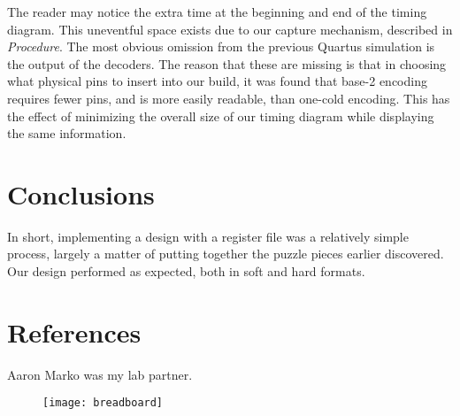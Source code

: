 \documentclass[titlepage]{article}
\begin{document}
        The reader may notice the extra time at the beginning and end of the timing diagram.
        This uneventful space exists due to our capture mechanism, described in \textit{Procedure}.
        The most obvious omission from the previous Quartus simulation is the output of the decoders.
        The reason that these are missing is that in choosing what physical pins to insert into our build, it was found that base-2 encoding requires fewer pins, and is more easily readable, than one-cold encoding.
        This has the effect of minimizing the overall size of our timing diagram while displaying the same information.
        
        
    \section{Conclusions}
        
        In short, implementing a design with a register file was a relatively simple process, largely a matter of putting together the puzzle pieces earlier discovered.
        Our design performed as expected, both in soft and hard formats.
        
        
        
        
    \section{References}
        Aaron Marko was my lab partner.
        
    \begin{figure}[h]
    	\centering
    	\texttt{[image: breadboard]}
    \end{figure}
    
\end{document}
